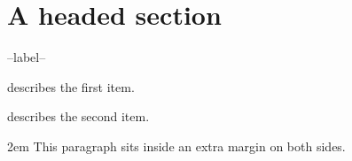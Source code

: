 \documentclass{article}
\begin{document}
\section*{A headed section}
\begin{labeling}{--label--}
\item[First] describes the first item.
\item[Second] describes the second item.
\end{labeling}
\begin{addmargin}[1em]{2em}
This paragraph sits inside an extra margin on both sides.
\end{addmargin}
\end{document}
